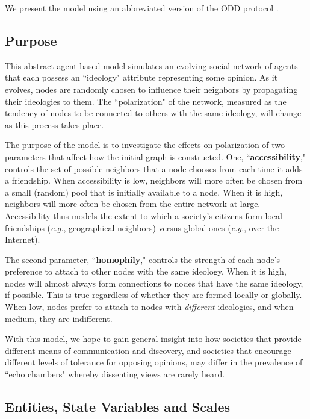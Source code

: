 
\label{sec:model}

We present the model using an abbreviated version of the ODD protocol
\cite{polhill_using_2008}.

\subsection{Purpose}

This abstract agent-based model simulates an evolving social network of agents
that each possess an ``ideology" attribute representing some opinion. As it
evolves, nodes are randomly chosen to influence their neighbors by propagating
their ideologies to them. The ``polarization" of the network, measured as the
tendency of nodes to be connected to others with the same ideology, will
change as this process takes place. 

The purpose of the model is to investigate the effects on polarization of two
parameters that affect how the initial graph is constructed. One,
``\textbf{accessibility}," controls the set of possible neighbors that a node
chooses from each time it adds a friendship. When accessibility is low,
neighbors will more often be chosen from a small (random) pool that is
initially available to a node. When it is high, neighbors will more often be
chosen from the entire network at large. Accessibility thus models the extent
to which a society's citizens form local friendships (\textit{e.g.},
geographical neighbors) versus global ones (\textit{e.g.}, over the Internet).

The second parameter, ``\textbf{homophily}," controls the strength of each
node's preference to attach to other nodes with the same ideology. When it is
high, nodes will almost always form connections to nodes that have the same
ideology, if possible. This is true regardless of whether they are formed
locally or globally. When low, nodes prefer to attach to nodes with
\textit{different} ideologies, and when medium, they are indifferent.

With this model, we hope to gain general insight into how societies that
provide different means of communication and discovery, and societies that
encourage different levels of tolerance for opposing opinions, may differ in
the prevalence of ``echo chambers" whereby dissenting views are rarely heard.

\subsection{Entities, State Variables and Scales}


